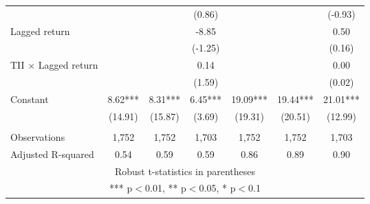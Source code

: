 \documentclass[]{article}
\begin{document}
\begin{tabular}{lcccccc}
 &  &  & (0.86) &  &  & (-0.93) \\
Lagged return &  &  & -8.85 &  &  & 0.50 \\
 &  &  & (-1.25) &  &  & (0.16) \\
TII $\times$ Lagged return &  &  & 0.14 &  &  & 0.00 \\
 &  &  & (1.59) &  &  & (0.02) \\
Constant & 8.62*** & 8.31*** & 6.45*** & 19.09*** & 19.44*** & 21.01*** \\
 & (14.91) & (15.87) & (3.69) & (19.31) & (20.51) & (12.99) \\
 &  &  &  &  &  &  \\
Observations & 1,752 & 1,752 & 1,703 & 1,752 & 1,752 & 1,703 \\
 Adjusted R-squared & 0.54 & 0.59 & 0.59 & 0.86 & 0.89 & 0.90 \\ \hline
\multicolumn{7}{c}{ Robust t-statistics in parentheses} \\
\multicolumn{7}{c}{ *** p$<$0.01, ** p$<$0.05, * p$<$0.1} \\
\end{tabular}
\end{document}
